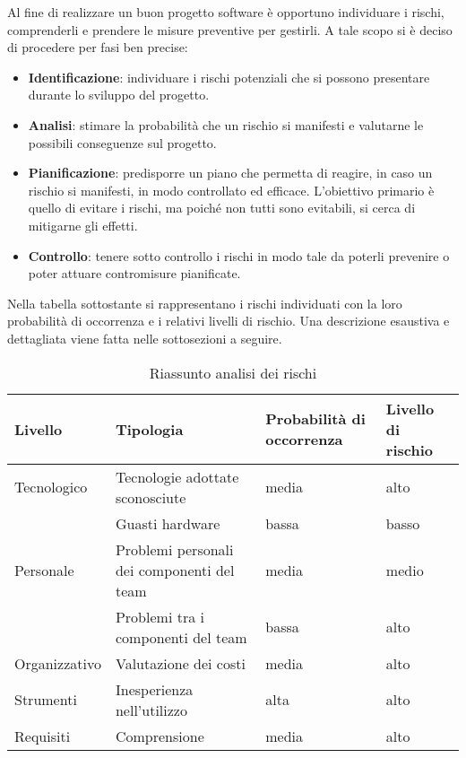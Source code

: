 	Al fine di realizzare un buon progetto software è opportuno individuare i rischi, comprenderli e prendere le misure preventive per gestirli. A tale scopo si è deciso di procedere per fasi ben precise:
	\begin{itemize}
		\item \textbf{Identificazione}: individuare i rischi potenziali che si possono presentare durante lo sviluppo del progetto.
		\item \textbf{Analisi}: stimare la probabilità che un rischio si manifesti e valutarne le possibili conseguenze sul progetto.
		\item \textbf{Pianificazione}: predisporre un piano che permetta di reagire, in caso un rischio si manifesti, in modo controllato ed efficace. L'obiettivo primario è quello di evitare i rischi, ma poiché non tutti sono evitabili, si cerca di mitigarne gli effetti.
		\item \textbf{Controllo}: tenere sotto controllo i rischi in modo tale da poterli prevenire o poter attuare contromisure pianificate.
	\end{itemize}
	Nella tabella sottostante si rappresentano i rischi individuati con la loro probabilità di occorrenza e i relativi livelli di rischio.
	Una descrizione esaustiva e dettagliata viene fatta nelle sottosezioni a seguire.
	\begin{table}[H]\centering \tabulinesep=3pt
			\begin{tabu}to \textwidth {|X[4]|X[3c]|X[4]|X[4]|}
				\hline
				Livello 			& Tipologia					& Probabilità di occorrenza 		& Livello di rischio  \\ \hline

				Tecnologico			& Tecnologie adottate sconosciute				& media 					& alto 		 \\ 
				  					& Guasti hardware								& bassa 					& basso 	 \\ \hline
				Personale		 	& Problemi personali dei componenti del team	& media 					& medio 	 \\ 
									& Problemi tra i componenti del team			& bassa 					& alto 		 \\ \hline
				Organizzativo	 	& Valutazione dei costi							& media 					& alto 		 \\ \hline
				Strumenti			& Inesperienza nell'utilizzo					& alta 						& alto 		 \\ \hline
				Requisiti		 	& Comprensione 									& media						& alto 		 \\ \hline
			\end{tabu}
		\caption{Riassunto analisi dei rischi}
	\end{table}

